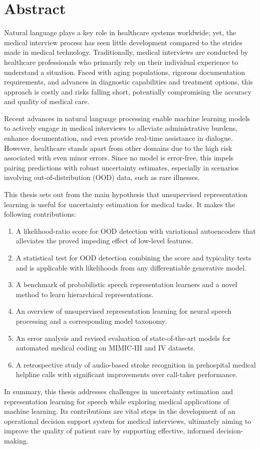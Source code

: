 
\chapter[abstract]{Abstract}

Natural language plays a key role in healthcare systems worldwide; yet, the medical interview process has seen little development compared to the strides made in medical technology. 
Traditionally, medical interviews are conducted by healthcare professionals who primarily rely on their individual experience to understand a situation. 
Faced with aging populations, rigorous documentation requirements, and advances in diagnostic capabilities and treatment options, this approach is costly and risks falling short, potentially compromising the accuracy and quality of medical care.

Recent advances in natural language processing enable machine learning models to actively engage in medical interviews to alleviate administrative burdens, enhance documentation, and even provide real-time assistance in dialogue. 
However, healthcare stands apart from other domains due to the high risk associated with even minor errors. Since no model is error-free, this impels pairing predictions with robust uncertainty estimates, especially in scenarios involving out-of-distribution (OOD) data, such as rare illnesses. 

This thesis sets out from the main hypothesis that unsupervised representation learning is useful for uncertainty estimation for medical tasks. 
It makes the following contributions:
%
\begin{enumerate}[topsep=3pt, partopsep=0pt, itemsep=3pt, parsep=0pt, leftmargin=2em, label=(\alph*)] %
    \item A likelihood-ratio score for OOD detection with variational autoencoders that alleviates the proved impeding effect of low-level features.
    \item A statistical test for OOD detection combining the score and typicality tests and is applicable with likelihoods from any differentiable generative model.
    \item A benchmark of probabilistic speech representation learners and a novel method to learn hierarchical representations.
    \item An overview of unsupervised representation learning for neural speech processing and a corresponding model taxonomy.
    \item An error analysis and revised evaluation of state-of-the-art models for automated medical coding on MIMIC-III and IV datasets. 
    \item A retrospective study of audio-based stroke recognition in prehospital medical helpline calls with significant improvements over call-taker performance.
\end{enumerate}
%
In summary, this thesis addresses challenges in uncertainty estimation and representation learning for speech while exploring medical applications of machine learning.
Its contributions are vital steps in the development of an operational decision support system for medical interviews, ultimately aiming to improve the quality of patient care by supporting effective, informed decision-making.
